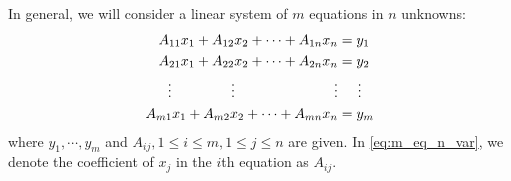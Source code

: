 \documentclass[12pt,letterpaper,reqno]{article}
\numberwithin{equation}{section}
\begin{document}
In general, we will consider a linear system of $m$ equations in $n$ unknowns:
\begin{equation}\label{eq:m_eq_n_var}
\begin{split}
	A_{11}x_1+A_{12}x_2+\cdots + A_{1n}x_n &=y_1 \\
	A_{21}x_1+A_{22}x_2+\cdots + A_{2n}x_n &=y_2 \\
	\vdots \hspace{1.5cm} \vdots \hspace{2.5cm} \vdots & \hspace{0.5cm}\vdots  \\
	A_{m1}x_1+A_{m2}x_2+\cdots + A_{mn}x_n &=y_m \\
\end{split}	
\end{equation}
where $y_1,\cdots, y_m$ and $A_{ij}, 1 \leq i \leq m, 1 \leq j \leq n$ are given. In \eqref{eq:m_eq_n_var}, we denote the coefficient of $x_j$ in the $i$th equation as $A_{ij}$.
\end{document}
